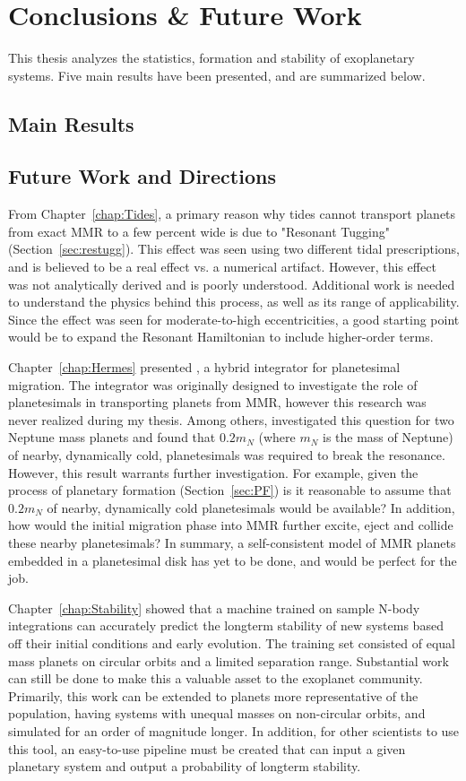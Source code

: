 \chapter{Conclusions \& Future Work}
\label{chap:conc}
This thesis analyzes the statistics, formation and stability of exoplanetary systems. 
Five main results have been presented, and are summarized below. 

\section{Main Results}


\section{Future Work and Directions}
From Chapter~\ref{chap:Tides}, a primary reason why tides cannot transport planets from exact MMR to a few percent wide is due to "Resonant Tugging" (Section~\ref{sec:restugg}).
This effect was seen using two different tidal prescriptions, and is believed to be a real effect vs. a numerical artifact. 
However, this effect was not analytically derived and is poorly understood. 
Additional work is needed to understand the physics behind this process, as well as its range of applicability.
Since the effect was seen for moderate-to-high eccentricities, a good starting point would be to expand the Resonant Hamiltonian to include higher-order terms. 

Chapter~\ref{chap:Hermes} presented \hermes, a hybrid integrator for planetesimal migration. 
The integrator was originally designed to investigate the role of planetesimals in transporting planets from MMR, however this research was never realized during my thesis. 
Among others, \citet{Chatterjee2015} investigated this question for two Neptune mass planets and found that $0.2m_N$ (where $m_N$ is the mass of Neptune) of nearby, dynamically cold, planetesimals was required to break the resonance. 
However, this result warrants further investigation. 
For example, given the process of planetary formation (Section~\ref{sec:PF}) is it reasonable to assume that $0.2m_N$ of nearby, dynamically cold planetesimals would be available?
In addition, how would the initial migration phase into MMR further excite, eject and collide these nearby planetesimals?
In summary, a self-consistent model of MMR planets embedded in a planetesimal disk has yet to be done, and \hermes would be perfect for the job.

Chapter~\ref{chap:Stability} showed that a machine trained on sample N-body integrations can accurately predict the longterm stability of new systems based off their initial conditions and early evolution. 
The training set consisted of equal mass planets on circular orbits and a limited separation range. 
Substantial work can still be done to make this a valuable asset to the exoplanet community.
Primarily, this work can be extended to planets more representative of the \kep population, having systems with unequal masses on non-circular orbits, and simulated for an order of magnitude longer. 
In addition, for other scientists to use this tool, an easy-to-use pipeline must be created that can input a given planetary system and output a probability of longterm stability. 

